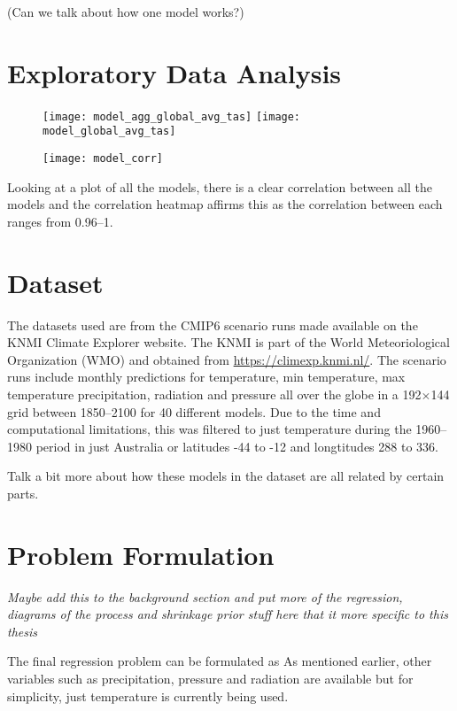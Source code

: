 \documentclass[honours,12pt]{unswthesis}
\numberwithin{equation}{section}
\begin{document}
(Can we talk about how one model works?)

\section{Exploratory Data Analysis}\label{eda}
\begin{figure}[!h]
    \texttt{[image: model\_agg\_global\_avg\_tas]}
    \texttt{[image: model\_global\_avg\_tas]}
    \centering
\end{figure}

\begin{figure}[t]
    \texttt{[image: model\_corr]}
    \centering
\end{figure}

{\noindent}Looking at a plot of all the models, there is a clear correlation between all the models and the correlation heatmap affirms this as the correlation between each
ranges from 0.96--1. 

\section{Dataset}\label{data}
The datasets used are from the CMIP6 scenario runs made available on the KNMI Climate Explorer website. The KNMI is part of the
World Meteoriological Organization (WMO) and obtained from \url{https://climexp.knmi.nl/}. The scenario runs include monthly predictions for temperature, min temperature, max temperature
precipitation, radiation and pressure all over the globe in a 192$\times$144 grid between 1850--2100 for 40 different models. Due to the time and computational
limitations, this was filtered to just temperature during the 1960--1980 period in just Australia or latitudes -44{\textdegree} to -12{\textdegree} 
and longtitudes 288{\textdegree} to 336{\textdegree}. 

Talk a bit more about how these models in the dataset are all related by certain parts.

{\section{Problem Formulation}}\label{problem-formulation}
\textit{Maybe add this to the background section and put more of the regression, diagrams of the process and shrinkage prior stuff here that it more specific to this thesis}

The final regression problem can be formulated as
As mentioned earlier, other variables such as precipitation, pressure and radiation are available but for simplicity, just temperature is currently being used.
\end{document}
